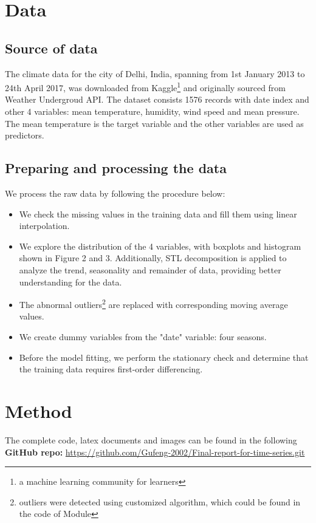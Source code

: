 \documentclass[12pt]{article}
\begin{document}
\section{Data}
\subsection{Source of data}
The climate data for the city of Delhi, India, spanning from 1st January 2013 to 24th April 2017, was downloaded 
from Kaggle\footnote{a machine learning community for learners} and originally sourced from 
Weather Undergroud API.  
The dataset consists 1576 records with date index and other 4 variables: mean temperature, 
humidity, wind speed and mean pressure. The mean temperature is the target variable and 
the other variables are used as predictors.


\subsection{Preparing and processing the data}
We process the raw data by following the procedure below:
\begin{itemize}
    \item We check the missing values in the training data and fill them using linear interpolation.
    \item We explore the distribution of the 4 variables, with boxplots and histogram shown in Figure 2 and 3. 
    Additionally, STL decomposition is applied to analyze the trend, seasonality and remainder of data, providing better understanding for the data.
    \item The abnormal outliers\footnote{outliers were detected using customized algorithm, which could be 
    found in the code of Module} 
    are replaced with corresponding moving average values.
    \item We create dummy variables from the "date" variable: four seasons. 
    \item Before the model fitting, we perform the stationary check and determine that the training data requires first-order differencing.   
\end{itemize}



\section{Method}
The complete code, latex documents and images can be found in the following \textbf{GitHub repo:}
\href{https://github.com/Gufeng-2002/Final-report-for-time-series.git}
{https://github.com/Gufeng-2002/Final-report-for-time-series.git}
\end{document}
